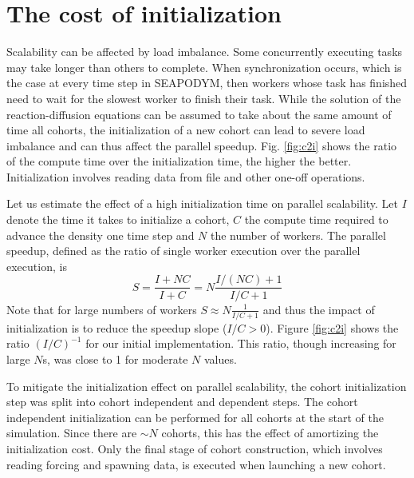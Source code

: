 \documentclass[a4paper,oneside,12pt]{article}
\begin{document}
\section{The cost of initialization}

Scalability can be affected by load imbalance. Some concurrently executing tasks may take longer than others
to complete. When synchronization occurs, which is the case at every time step in SEAPODYM, then 
workers whose task has finished need to wait for the slowest worker to finish their task. While the solution of
the reaction-diffusion equations can be assumed to take about the same amount of time all cohorts, the initialization of a new cohort
can lead to severe load imbalance and can thus affect the parallel speedup. 
Fig. \ref{fig:c2i} shows the ratio of the compute time over the initialization time, the higher the 
better. Initialization involves reading data from file and other one-off operations. 

Let us estimate the effect of a high initialization time on parallel scalability. 
Let $I$ denote the time it takes to initialize a cohort, $C$ the compute time required to advance the density one time step and $N$ the 
number of workers. The parallel speedup, defined as the ratio of single worker execution over the 
parallel execution, is
\begin{equation}
    S = \frac{I + N C}{I + C} = N \frac{I/(NC) + 1}{I/C + 1}
\end{equation}
Note that for large numbers of workers $S \approx N \frac{1}{I/C + 1}$ and thus the impact of initialization is to reduce the speedup slope 
($I/C > 0$). Figure \ref{fig:c2i} shows the ratio $(I/C)^{-1}$ for our initial implementation. This ratio, though increasing for 
large $N$s, was close to 1 for moderate $N$ values. 

To mitigate the initialization effect on parallel scalability, the cohort 
initialization step was split into cohort independent and dependent steps. The cohort independent initialization can be performed 
for all cohorts at the start of the simulation. Since there are $\sim N$ cohorts, this has the effect of amortizing the initialization 
cost. Only the final stage of cohort construction, which 
involves reading forcing and spawning data, is executed when launching a new cohort. 
\end{document}
